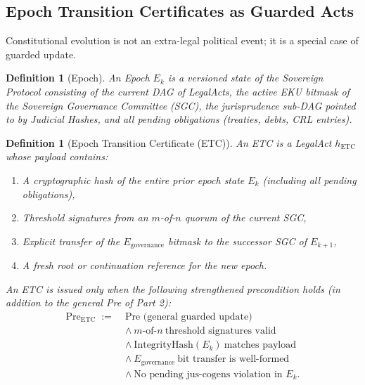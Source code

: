 \documentclass[11pt,a4paper]{article}
\newtheorem{definition}[theorem]{Definition}
\begin{document}
\subsection{Epoch Transition Certificates as Guarded Acts}

Constitutional evolution is not an extra-legal political event; it is a special case of guarded update.

\begin{definition}[Epoch]
An \emph{Epoch} \(E_k\) is a versioned state of the Sovereign Protocol consisting of the current DAG of LegalActs, the active EKU bitmask of the Sovereign Governance Committee (SGC), the jurisprudence sub-DAG pointed to by Judicial Hashes, and all pending obligations (treaties, debts, CRL entries).
\end{definition}

\begin{definition}[Epoch Transition Certificate (ETC)]
An ETC is a LegalAct \(h_{\text{ETC}}\) whose payload contains:
\begin{enumerate}
\item A cryptographic hash of the entire prior epoch state \(E_k\) (including all pending obligations),

\item Threshold signatures from an \(m\)-of-\(n\) quorum of the current SGC,

\item Explicit transfer of the \(E_{\text{governance}}\) bitmask to the successor SGC of \(E_{k+1}\),

\item A fresh root or continuation reference for the new epoch.
\end{enumerate}
An ETC is issued only when the following strengthened precondition holds (in addition to the general Pre of Part 2):
\begin{align*}
\text{Pre}_{\text{ETC}} \;:=\; &
\text{Pre (general guarded update)} \\
&\land\ m\text{-of-}n\ \text{threshold signatures valid} \\
&\land\ \text{IntegrityHash}(E_k)\ \text{matches payload} \\
&\land\ E_{\text{governance}}\ \text{bit transfer is well-formed} \\
&\land\ \text{No pending jus-cogens violation in } E_k.
\end{align*}
\end{definition}
\end{document}
